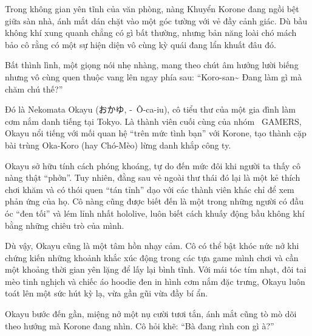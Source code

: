 \documentclass[../main.tex]{subfiles}
\begin{document}


Trong không gian yên tĩnh của văn phòng, nàng Khuyển Korone đang ngồi bệt giữa sàn nhà, ánh mắt dán chặt vào một góc tường với vẻ đầy cảnh giác. Dù bầu không khí xung quanh chẳng có gì bất thường, nhưng bản năng loài chó mách bảo cô rằng có một sự hiện diện vô cùng kỳ quái đang lẩn khuất đâu đó.

Bất thình lình, một giọng nói nhẹ nhàng, mang theo chút âm hưởng lười biếng nhưng vô cùng quen thuộc vang lên ngay phía sau: ``Koro-san\~{} Đang làm gì mà chăm chú thế?''

\chrint

Đó là Nekomata Okayu (おかゆ, -\ Ô-ca-iu), cô tiểu thư của một gia đình làm cơm nắm danh tiếng tại Tokyo. Là thành viên cuối cùng của nhóm \hll\ GAMERS, Okayu nổi tiếng với mối quan hệ ``trên mức tình bạn'' với Korone, tạo thành cặp bài trùng Oka-Koro (hay Chó-Mèo) lừng danh khắp công ty.

Okayu sở hữu tính cách phóng khoáng, tự do đến mức đôi khi người ta thấy cô nàng thật ``phởn''. Tuy nhiên, đằng sau vẻ ngoài thư thái đó lại là một kẻ thích chơi khăm và có thói quen ``tán tỉnh'' dạo với các thành viên khác chỉ để xem phản ứng của họ. Cô nàng cũng được biết đến là một trong những người có đầu óc ``đen tối'' và lém lỉnh nhất hololive, luôn biết cách khuấy động bầu không khí bằng những chiêu trò của mình.

Dù vậy, Okayu cũng là một tâm hồn nhạy cảm. Cô có thể bật khóc nức nở khi chứng kiến những khoảnh khắc xúc động trong các tựa game mình chơi và cần một khoảng thời gian yên lặng để lấy lại bình tĩnh. Với mái tóc tím nhạt, đôi tai mèo tinh nghịch và chiếc áo hoodie đen in hình cơm nắm đặc trưng, Okayu luôn toát lên một sức hút kỳ lạ, vừa gần gũi vừa đầy bí ẩn.

\chrint


Okayu bước đến gần, miệng nở một nụ cười tươi tắn, ánh mắt cũng tò mò dõi theo hướng mà Korone đang nhìn. Cô hỏi khẽ: ``Bà đang rình con gì à?''
\end{document}
